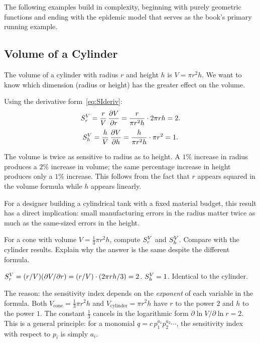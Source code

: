 The following examples build in complexity, beginning with
purely geometric functions and ending with the epidemic model
that serves as the book's primary running example.

\subsection{Volume of a Cylinder}
\label{subsec:cylinder}

The volume of a cylinder with radius $r$ and height $h$ is $V = \pi r^2 h$.
We want to know which dimension (radius or height)
has the greater effect on the volume.

Using the derivative form~\eqref{eq:SIderiv}:
\begin{equation}
  S_{r}^{V} = \frac{r}{V}\,\frac{\partial V}{\partial r}
            = \frac{r}{\pi r^2 h}\cdot 2\pi r h = 2.
  \label{eq:Vr}
\end{equation}
\begin{equation}
  S_{h}^{V} = \frac{h}{V}\,\frac{\partial V}{\partial h}
            = \frac{h}{\pi r^2 h}\cdot \pi r^2 = 1.
  \label{eq:Vh}
\end{equation}

The volume is twice as sensitive to radius as to height.
A $1\%$ increase in radius produces a $2\%$ increase in volume;
the same percentage increase in height produces only a $1\%$ increase.
This follows from the fact that $r$ appears squared in the volume formula
while $h$ appears linearly.

For a designer building a cylindrical tank with a fixed material budget,
this result has a direct implication: small manufacturing errors in the radius
matter twice as much as the same-sized errors in the height.

\begin{selfcheck}
For a cone with volume $V = \frac{1}{3}\pi r^2 h$, compute
$S_{r}^{V}$ and $S_{h}^{V}$. Compare with the cylinder results.
Explain why the answer is the same despite the different formula.
\end{selfcheck}
\begin{scAnswer}
$S_{r}^{V} = (r/V)(\partial V/\partial r) = (r/V)\cdot(2\pi r h/3) = 2$.
$S_{h}^{V} = 1$. Identical to the cylinder.

The reason: the sensitivity index depends on the \textit{exponent}
of each variable in the formula. Both $V_{\text{cone}} = \frac{1}{3}\pi r^2 h$
and $V_{\text{cylinder}} = \pi r^2 h$ have $r$ to the power $2$ and
$h$ to the power $1$. The constant $\frac{1}{3}$ cancels in the
logarithmic form $\partial\ln V/\partial\ln r = 2$. This is a
general principle: for a monomial $q = c\,p_1^{a_1}p_2^{a_2}\cdots$,
the sensitivity index with respect to $p_i$ is simply $a_i$.
\end{scAnswer}

